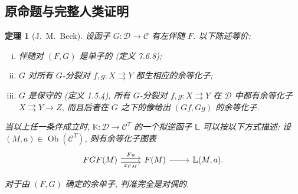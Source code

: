 \documentclass[11pt]{article}
\newcommand{\Obj}{\operatorname{Ob}}
\renewcommand{\index}[2][]{\relax}
\newcommand{\CorpusNumber}{0}
\newtheorem{theorem}{定理}
\theoremstyle{definition}
\begin{document}
\subsection*{原命题与完整人类证明}
\def\CorpusNumber{7.6.14}
\begin{theorem}[J.\ M.\ Beck]\label{prop:Beck}
	\index{Beck dingli@Beck 定理}
	设函子 $G: \mathcal{D} \to \mathcal{C}$ 有左伴随 $F$. 以下陈述等价:
	\begin{enumerate}[(i)]
		\item 伴随对 $(F, G)$ 是单子的 (定义 7.6.8);
		\item $G$ 对所有 $G$-分裂对 $f, g: X \rightrightarrows Y$ 都生相应的余等化子;
		\item $G$ 是保守的 (定义 1.5.4), 所有 $G$-分裂对 $f, g: X \rightrightarrows Y$ 在 $\mathcal{D}$ 中都有余等化子 $X \rightrightarrows Y \to Z$, 而且后者在 $G$ 之下的像给出 $(Gf, Gg)$ 的余等化子.
	\end{enumerate}

	当以上任一条件成立时, $\mathbb{K}: \mathcal{D} \to \mathcal{C}^T$ 的一个拟逆函子 $\mathbb{L}$ 可以按以下方式描述: 设 $(M, a) \in \Obj(\mathcal{C}^T)$, 则有余等化子图表
\renewcommand{\theequation}{7.6.1}
	\begin{equation}\label{eqn:Beck-aux1}\begin{tikzcd}
		FGF(M) \arrow[shift left, r, "Fa"] \arrow[shift right, r, "\varepsilon_{FM}"'] & F(M) \arrow[r] & \mathbb{L}(M, a).
	\end{tikzcd}\end{equation}

	对于由 $(F, G)$ 确定的余单子, 判准完全是对偶的.
\end{theorem}
\end{document}
